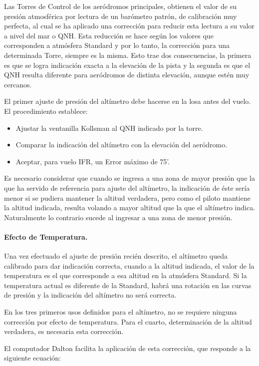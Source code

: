 \documentclass{article}
\begin{document}
Las Torres de Control de los aeródromos principales, obtienen el valor de su presión atmosférica por lectura de un barómetro patrón, de calibración muy perfecta, al cual se ha aplicado una corrección para reducir esta lectura a
su valor a nivel del mar o QNH. Esta reducción se hace según los valores que corresponden a atmósfera Standard y por lo tanto, la corrección para una determinada Torre, siempre es la misma. Esto trae dos consecuencias, la primera es que se logra indicación exacta a la elevación de la pista y la segunda es que el QNH resulta diferente para aeródromos de distinta elevación, aunque estén muy cercanos.

El primer ajuste de presión del altímetro debe hacerse en la losa antes del vuelo. El procedimiento establece:
\begin{itemize}
\item Ajustar la ventanilla Kollsman al QNH indicado por la torre.
\item Comparar la indicación del altímetro con la elevación del aeródromo.
\item Aceptar, para vuelo IFR, un Error máximo de 75'.
\end{itemize}
Es necesario considerar que cuando se ingresa a una zona de mayor presión que la que ha servido de referencia para ajuste del altímetro, la indicación de éste sería menor si se pudiera mantener la altitud verdadera, pero como el piloto mantiene la altitud indicada, resulta volando a mayor altitud que la que el altímetro indica. Naturalmente lo contrario sucede al ingresar a una zona de menor presión.

\paragraph{Efecto de Temperatura.}

Una vez efectuado el ajuste de presión recién descrito, el altímetro queda calibrado para dar indicación correcta, cuando a la altitud indicada, el valor de la temperatura es el que corresponde a esa altitud en la atmósfera Standard. Si la temperatura actual es diferente de la Standard, habrá una rotación en las curvas de presión y la indicación del altímetro no será correcta.

En los tres primeros usos definidos para el altímetro, no se requiere ninguna corrección por efecto de temperatura. Para el cuarto, determinación de la altitud verdadera, es necesaria esta corrección.

El computador Dalton facilita la aplicación de esta corrección, que responde a la siguiente ecuación:
\end{document}
